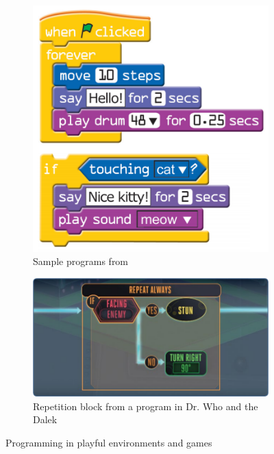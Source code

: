 \documentclass{sigchi}
\begin{document}
        \begin{figure}
            \centering
            \begin{subfigure}[!h]{0.5\columnwidth}
                \includegraphics[width=\textwidth]{scratch}
                \caption{Sample programs from \scratch}
                \label{fig:scratch}
            \end{subfigure}%

            \begin{subfigure}[!h]{0.7\columnwidth}
                \includegraphics[width=\textwidth]{dr-who}
                \caption{Repetition block from a program in Dr. Who and the
                         Dalek}
                \label{fig:dr-who}
            \end{subfigure}
            \caption{Programming in playful environments and games}
            \label{fig:samples}
        \end{figure}
\end{document}
